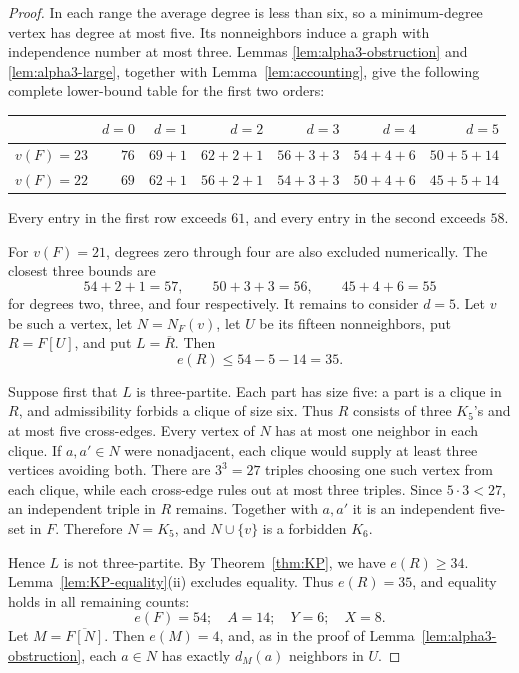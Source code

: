 \documentclass[11pt,reqno,a4paper]{amsart}
\theoremstyle{definition}
\theoremstyle{remark}
\newcommand{\comp}[1]{\overline{#1}}
\begin{document}
\begin{proof}
In each range the average degree is less than six, so a minimum-degree
vertex has degree at most five.  Its nonneighbors induce a graph with
independence number at most three.  Lemmas \ref{lem:alpha3-obstruction} and
\ref{lem:alpha3-large}, together with Lemma~\ref{lem:accounting}, give the
following complete lower-bound table for the first two orders:
\begin{center}\small
\begin{tabular}{c@{\quad}rrrrrr}
\toprule
& $d=0$ & $d=1$ & $d=2$ & $d=3$ & $d=4$ & $d=5$\\
\midrule
$v(F)=23$ & $76$ & $69+1$ & $62+2+1$ & $56+3+3$
            & $54+4+6$ & $50+5+14$\\
$v(F)=22$ & $69$ & $62+1$ & $56+2+1$ & $54+3+3$
            & $50+4+6$ & $45+5+14$\\
\bottomrule
\end{tabular}
\end{center}
Every entry in the first row exceeds $61$, and every entry in the second
exceeds $58$.

For $v(F)=21$, degrees zero through four are also excluded numerically.  The
closest three bounds are
\[
  54+2+1=57,\qquad 50+3+3=56,\qquad 45+4+6=55
\]
for degrees two, three, and four respectively.  It remains to consider
$d=5$.  Let $v$ be such a vertex, let $N=N_F(v)$, let $U$ be its fifteen
nonneighbors, put $R=F[U]$, and put $L=\comp R$.  Then
\begin{equation}\label{eq:alpha4-fifteen}
  e(R)\leq54-5-14=35.
\end{equation}

Suppose first that $L$ is three-partite.  Each part has size five: a part
is a clique in $R$, and admissibility forbids a clique of size six.  Thus
$R$ consists of three $K_5$'s and at most five cross-edges.  Every vertex
of $N$ has at most one neighbor in each clique.  If $a,a'\in N$ were
nonadjacent, each clique would supply at least three vertices avoiding both.
There are $3^3=27$ triples choosing one such vertex from each clique, while
each cross-edge rules out at most three triples.  Since $5\cdot3<27$, an
independent triple in $R$ remains.  Together with $a,a'$ it is an
independent five-set in $F$.  Therefore $N=K_5$, and $N\cup\{v\}$ is a
forbidden $K_6$.

Hence $L$ is not three-partite.  By Theorem~\ref{thm:KP}, we have
$e(R)\geq34$.  Lemma~\ref{lem:KP-equality}(ii) excludes equality.  Thus
$e(R)=35$, and equality holds in all remaining counts:
\[
  e(F)=54;\quad A=14;\quad Y=6;\quad X=8.
\]
Let $M=\comp{F[N]}$.  Then $e(M)=4$, and, as in the proof of
Lemma~\ref{lem:alpha3-obstruction}, each $a\in N$ has exactly $d_M(a)$
neighbors in $U$.


\end{proof}
\end{document}
